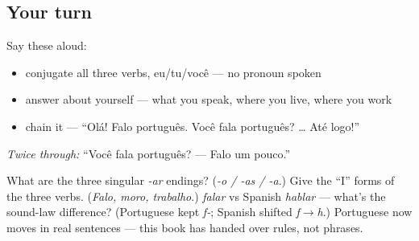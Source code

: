 \subsection*{Your turn}
Say these aloud:

\begin{itemize}
\raggedright
  \item conjugate all three verbs, eu/tu/você — no pronoun spoken
  \item answer about yourself — what you speak, where you live, where you work
  \item chain it — \textquotedblleft{}Olá! Falo português. Você fala português? … Até logo!\textquotedblright{}
\end{itemize}

\emph{Twice through:} \textquotedblleft{}Você fala português? — Falo um pouco.\textquotedblright{}

\begin{tcolorbox}[breakable,colback=teal!4,colframe=teal!35!black,title={Before you move on}]
What are the three singular \emph{-ar} endings? (\emph{-o / -as / -a}.) Give the \textquotedblleft{}I\textquotedblright{} forms of the three verbs. (\emph{Falo, moro, trabalho}.) \emph{falar} vs Spanish \emph{hablar} — what's the sound-law difference? (Portuguese kept \emph{f-}; Spanish shifted \emph{f$\to$h}.) Portuguese now moves in real sentences — this book has handed over rules, not phrases.
\end{tcolorbox}
